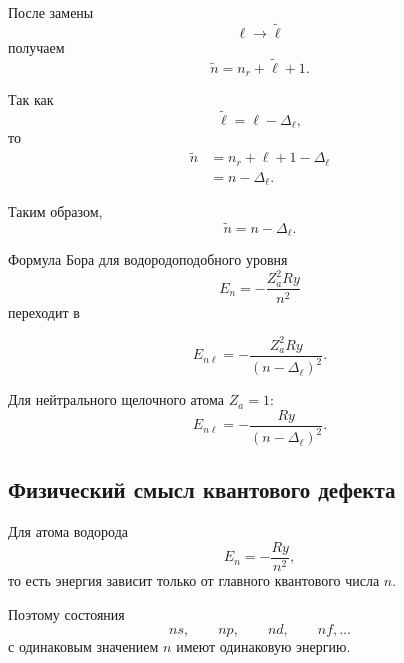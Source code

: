 \documentclass[../final.tex]{subfiles}
\begin{document}
После замены
\begin{equation*}
    \ell\rightarrow\tilde\ell
\end{equation*}
получаем
\begin{equation*}
    \tilde n
    =
    n_r+\tilde\ell+1.
\end{equation*}

Так как
\begin{equation*}
    \tilde\ell=\ell-\Delta_\ell,
\end{equation*}
то
\begin{align*}
    \tilde n
    &=
    n_r+\ell+1-\Delta_\ell
    \\
    &=
    n-\Delta_\ell.
\end{align*}

Таким образом,
\begin{equation*}
    \boxed{
        \tilde n=n-\Delta_\ell
    }.
\end{equation*}

Формула Бора для водородоподобного уровня
\begin{equation*}
    E_n
    =
    -\frac{Z_a^2Ry}{n^2}
\end{equation*}
переходит в

\begin{equation*}
    \boxed{
        E_{n\ell}
        =
        -\frac{Z_a^2Ry}
        {(n-\Delta_\ell)^2}
    }.
\end{equation*}


Для нейтрального щелочного атома \(Z_a=1\):
\begin{equation*}
    \boxed{
        E_{n\ell}
        =
        -\frac{Ry}
        {(n-\Delta_\ell)^2}
    }.
\end{equation*}

\subsection{Физический смысл квантового дефекта}

Для атома водорода
\begin{equation*}
    E_n
    =
    -\frac{Ry}{n^2},
\end{equation*}
то есть энергия зависит только от главного квантового числа \(n\).

Поэтому состояния
\begin{equation*}
    ns,\qquad
    np,\qquad
    nd,\qquad
    nf,\ldots
\end{equation*}
с одинаковым значением \(n\) имеют одинаковую энергию.
\end{document}
